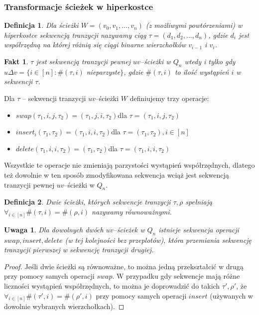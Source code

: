 \documentclass{pracamgr}
\newtheorem{defi}{Definicja}[section] %
\newtheorem{remark}[theorem]{Uwaga}
\newtheorem{fact}[theorem]{Fakt}
\begin{document}
    \subsubsection{Transformacje ścieżek w hiperkostce}
     \begin{defi}\label{sekwencja tranzycji}
      Dla ścieżki $W=(v_0,v_1,...,v_n)$ (z możliwymi powtórzeniami) w hiperkostce \emph{sekwencją tranzycji} nazywamy ciąg $\tau=(d_1,d_2,...,d_n)$,
      gdzie $d_i$ jest współrzędną na której różnią się ciągi binarne wierzchołków $v_{i-1}$ i $v_i$.
     \end{defi}
     \begin{fact}\label{sekwencja tranzycji - parzystość}%
      $\tau$ jest sekwencją tranzycji pewnej $uv$--ścieżki w $Q_n$ wtedy i tylko gdy\newline
      $u\Delta v=\{i\in[n]:\#(\tau,i)$ nieparzyste$\}$,
      gdzie $\#(\tau,i)$ to ilość wystąpień $i$ w sekwencji $\tau$.
     \end{fact}
     Dla $\tau$ -- sekwencji tranzycji $uv$--ścieżki $W$ definiujemy trzy operacje:
     \begin{itemize}
      \item $swap(\tau_1,i,j,\tau_2)=(\tau_1,j,i,\tau_2)$\quad dla $\tau=(\tau_1,i,j,\tau_2)$
      \item $insert_i(\tau_1,\tau_2)=(\tau_1,i,i,\tau_2)$\quad dla $\tau=(\tau_1,\tau_2),i\in[n]$
      \item $delete(\tau_1,i,i,\tau_2)=(\tau_1,\tau_2)$\quad dla $\tau=(\tau_1,i,i,\tau_2)$
     \end{itemize}
     Wszystkie te operacje nie zmieniają parzystości wystąpień współrzędnych, dlatego też dowolnie w ten sposób zmodyfikowana sekwencja
     wciąż jest sekwencją tranzycji pewnej $uv$--ścieżki w $Q_n$.
     \begin{defi}\label{sciezki rownowazne}
      Dwie ścieżki, których sekwencje tranzycji $\tau,\rho$ spełniają $\forall_{i\in[n]}\#(\tau,i)=\#(\rho,i)$ nazywamy \emph{równoważnymi}.
     \end{defi}
     \begin{remark}\label{przeksztalcanie sciezek}
      Dla dowolnych dwóch $uv$--ścieżek w $Q_n$ istnieje sekwencja operacji $swap,insert,delete$ (w tej kolejności bez przeplotów),
      która przemiania sekwencję tranzycji pierwszej w sekwencję tranzycji drugiej.
     \end{remark}
     \begin{proof}
      Jeśli dwie ścieżki są równoważne, to można jedną przekształcić w drugą przy pomocy samych operacji $swap$.\newline
      W przypadku gdy sekwencje mają różne liczności wystąpień współrzędnych, to można je doprowadzić do takich $\tau',\rho'$,
      że $\forall_{i\in[n]}\#(\tau',i)=\#(\rho',i)$ przy pomocy samych operacji $insert$ (używanych w dowolnie wybranych wierzchołkach).
     \end{proof}
\end{document}
